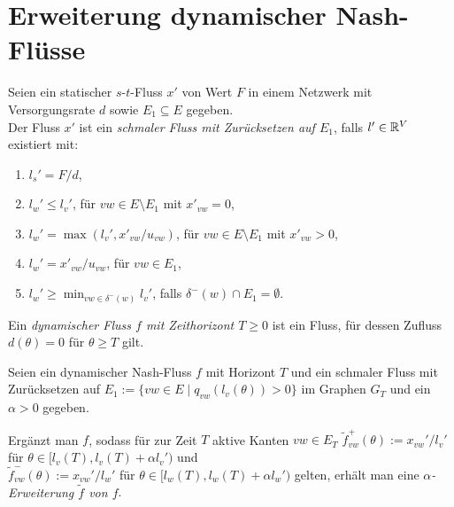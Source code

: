 \section{Erweiterung dynamischer Nash-Flüsse}

\begin{frame}\begin{definition}\label{def-thin-flow}
		Seien ein statischer $s$-$t$-Fluss  $x'$ von Wert $F$ in einem Netzwerk mit Versorgungsrate $d$ sowie $E_1\subseteq E$ gegeben. \\
		Der Fluss $x'$ ist ein \emph{schmaler Fluss mit Zurücksetzen auf $E_1$}, falls $l'\in\mathbb{R}^V$ existiert mit:
		\begin{enumerate}[label=(T\arabic*)]
			\item\label{def-thin-flow-source} $l_s' = F/d$,
			\item\label{def-thin-flow-x-zero} $l_w' \leq l_v'$, \tabto{5cm} für $vw\in E \setminus E_1$ mit $x'_{vw}=0$,
			\item\label{def-thin-flow-x-positive} $l_w' = \max(l_v', x'_{vw} / u_{vw} )$,  \tabto{5cm} für $vw\in E\setminus E_1$ mit $x'_{vw} > 0$,
			\item\label{def-thin-flow-resetting-edge} $l_w' = x'_{vw} / u_{vw}$,  \tabto{5cm} für $vw\in E_1$,
			\item\label{def-thin-flow-no-resetting-edge} $l_w' \geq \min_{vw\in \delta^-(w)} l_v'$, \tabto{5cm} falls $\delta^-(w)\cap E_1 = \emptyset$.
		\end{enumerate}
	\end{definition}
\end{frame}

\begin{frame}
	\begin{definition}
		Ein \emph{dynamischer Fluss $f$ mit Zeithorizont $T\geq0$} ist ein Fluss, für dessen Zufluss $d(\theta)= 0$ für $\theta\geq T$ gilt.
	\end{definition}

	\begin{definition}
		Seien ein dynamischer Nash-Fluss $f$ mit Horizont $T$ und ein schmaler Fluss mit Zurücksetzen auf $E_1 := \{ vw\in E \mid q_{vw}(l_v(\theta)) > 0 \}$ im Graphen $G_T$ und ein $\alpha > 0$ gegeben.
		
		Ergänzt man $f$, sodass für zur Zeit $T$ aktive Kanten $vw\in E_T$
		$\tilde{f}_{vw}^+(\theta):= x_{vw}'/l_v'$ für $\theta\in [l_v(T), l_v(T)+\alpha l_v')$ und \\
		$\tilde{f}_{vw}^-(\theta):=x_{vw}'/l_w'$ für $\theta\in [l_w(T), l_w(T)+\alpha l_w')$
		gelten, erhält man eine \emph{$\alpha$-Erweiterung $\tilde{f}$ von $f$}.
	\end{definition}
\end{frame}

